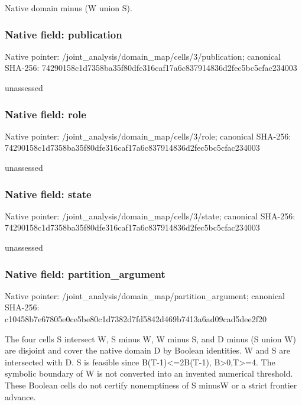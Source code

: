 \documentclass[10pt,a4paper]{article}
\begin{document}
\begingroup\raggedright\sloppy Native domain minus (W union S).\par\endgroup

\subsubsection{Native field: publication}
Native pointer: /joint\_\allowbreak{}analysis/domain\_\allowbreak{}map/cells/3/publication; canonical SHA-256: 74290158c1d7358ba35f80dfe316caf17a6c837914836d2fec5bc5cfac234003

\begingroup\raggedright\sloppy unassessed\par\endgroup

\subsubsection{Native field: role}
Native pointer: /joint\_\allowbreak{}analysis/domain\_\allowbreak{}map/cells/3/role; canonical SHA-256: 74290158c1d7358ba35f80dfe316caf17a6c837914836d2fec5bc5cfac234003

\begingroup\raggedright\sloppy unassessed\par\endgroup

\subsubsection{Native field: state}
Native pointer: /joint\_\allowbreak{}analysis/domain\_\allowbreak{}map/cells/3/state; canonical SHA-256: 74290158c1d7358ba35f80dfe316caf17a6c837914836d2fec5bc5cfac234003

\begingroup\raggedright\sloppy unassessed\par\endgroup

\subsubsection{Native field: partition\_\allowbreak{}argument}
Native pointer: /joint\_\allowbreak{}analysis/domain\_\allowbreak{}map/partition\_\allowbreak{}argument; canonical SHA-256: c10458b7e67805e0ce5be80c1d7382d7fd5842d469b7413a6ad09cad5dee2f20

\begingroup\raggedright\sloppy The four cells S intersect W,\allowbreak{} S minus W,\allowbreak{} W minus S,\allowbreak{} and D minus (S union W) are disjoint and cover the native domain D by Boolean identities. W and S are intersected with D. S is feasible since B(T-1)<=\allowbreak{}2B(T-1),\allowbreak{} B>0,\allowbreak{}T>=\allowbreak{}4. The symbolic boundary of W is not converted into an invented numerical threshold. These Boolean cells do not certify nonemptiness of S minusW or a strict frontier advance.\par\endgroup
\end{document}

